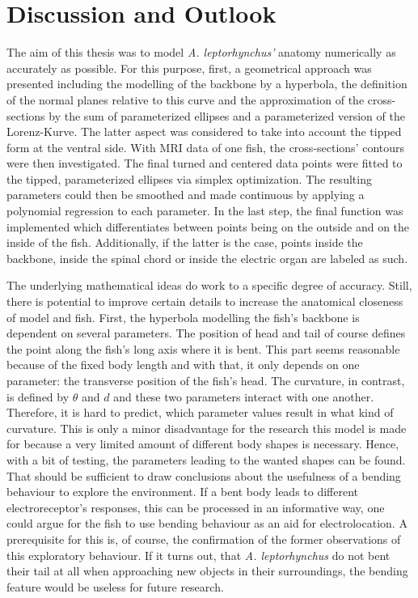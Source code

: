 \chapter{Discussion and Outlook}
    \label{Discussion}

The aim of this thesis was to model \textit{A. leptorhynchus'} anatomy numerically as accurately as possible. For this purpose, first, a geometrical approach was presented including the modelling of the backbone by a hyperbola, the definition of the normal planes relative to this curve and the approximation of the cross-sections by the sum of parameterized ellipses and a parameterized version of the Lorenz-Kurve. The latter aspect was considered to take into account the tipped form at the ventral side. With MRI data of one fish, the cross-sections' contours were then investigated. The final turned and centered data points were fitted to the tipped, parameterized ellipses via simplex optimization. The resulting parameters could then be smoothed and made continuous by applying a polynomial regression to each parameter. In the last step, the final function was implemented which differentiates between points being on the outside and on the inside of the fish. Additionally, if the latter is the case, points inside the backbone, inside the spinal chord or inside the electric organ are labeled as such.

The underlying mathematical ideas do work to a specific degree of accuracy. Still, there is potential to improve certain details to increase the anatomical closeness of model and fish. First, the hyperbola modelling the fish's backbone is dependent on several parameters. The position of head and tail of course defines the point along the fish's long axis where it is bent. This part seems reasonable because of the fixed body length and with that, it only depends on one parameter: the transverse position of the fish's head. The curvature, in contrast, is defined by $\theta$ and $d$ and these two parameters interact with one another. Therefore, it is hard to predict, which parameter values result in what kind of curvature. This is only a minor disadvantage for the research this model is made for because a very limited amount of different body shapes is necessary. Hence, with a bit of testing, the parameters leading to the wanted shapes can be found. That should be sufficient to draw conclusions about the usefulness of a bending behaviour to explore the environment. If a bent body leads to different electroreceptor's responses, this can be processed in an informative way, one could argue for the fish to use bending behaviour as an aid for electrolocation. A prerequisite for this is, of course, the confirmation of the former observations of this exploratory behaviour. If it turns out, that \textit{A. leptorhynchus} do not bent their tail at all when approaching new objects in their surroundings, the bending feature would be useless for future research. 

